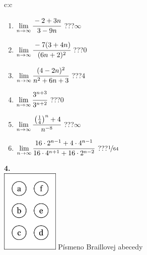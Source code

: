 \documentclass[10pt]{report}
\begin{document}
\begin{tabular}{c:c}
\begin{minipage}[c][104.5mm][t]{0.5\linewidth}
\begin{center}
\begin{minipage}{0.79\linewidth}
\begin{center}
\begin{varwidth}{\linewidth}
\begin{enumerate}
\normalsize
\item $\lim\limits_{n\to\infty}\cfrac{-2+3n}{3-9n}$\quad \dotfill\; ???\;\dotfill \quad $\infty$
\item $\lim\limits_{n\to\infty}\cfrac{-7(3+4n)}{(6n+2)^2}$\quad \dotfill\; ???\;\dotfill \quad $0$
\item $\lim\limits_{n\to\infty}\cfrac{(4-2n)^2}{n^2+6n+3}$\quad \dotfill\; ???\;\dotfill \quad $4$
\item $\lim\limits_{n\to\infty}\cfrac{3^{n+3}}{3^{n+2}}$\quad \dotfill\; ???\;\dotfill \quad $0$
\item $\lim\limits_{n\to\infty}\cfrac{\left(\frac{1}{4}\right)^n +4}{n^{-8}}$\quad \dotfill\; ???\;\dotfill \quad $\infty$
\item $\lim\limits_{n\to\infty}\cfrac{16\cdot 2^{n-1}+4\cdot 4^{n-1}}{16\cdot 4^{n+1}+16\cdot 2^{n-2}}$\quad \dotfill\; ???\;\dotfill \quad $\nicefrac{1}{64}$
\end{enumerate}
\end{varwidth}
\end{center}
\end{minipage}
\begin{minipage}{0.20\linewidth}
\begin{center}
{\Huge\bfseries 4.} \\[2mm]
\includegraphics[height=40mm]{../images/braille.png}
{\small Písmeno Braillovej abecedy}
\end{center}
\end{minipage}
\end{center}
\end{minipage}
%
\end{tabular}
\newpage
\thispagestyle{empty}
\end{document}
